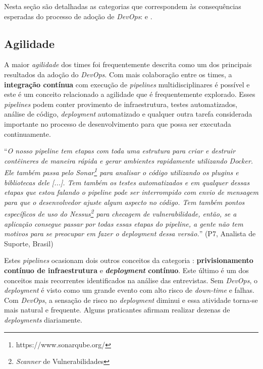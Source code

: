 Nesta seção são detalhadas as categorias que correspondem às consequências
esperadas do processo de adoção de {\it DevOps}:  e .

\subsection{Agilidade}\label{subsecao_agilidade}

A maior {\it agilidade} dos times foi frequentemente descrita como um dos
principais resultados da adoção do {\it DevOps}. Com mais colaboração entre os
times, a {\bf integração contínua} com execução de {\it pipelines}
multidisciplinares é possível e este é um conceito relacionado a agilidade que
é frequentemente explorado. Esses {\it pipelines} podem conter provimento
de infraestrutura, testes automatizados, análise de código, {\it deployment}
automatizado e qualquer outra tarefa considerada importante no processo de
desenvolvimento para que possa ser executada continuamente.

\begin{mq}
``\emph{O nosso pipeline tem etapas com toda uma estrutura para criar e destruir
contêineres de maneira rápida e gerar ambientes rapidamente utilizando Docker.
Ele também passa pelo Sonar\footnote{https://www.sonarqube.org/} para
analisar o código utilizando os plugins e bibliotecas dele [...]. Tem também os
testes automatizados e em qualquer dessas etapas que estou falando o pipeline
pode ser interrompido com envio de mensagem para que o desenvolvedor ajuste
algum aspecto no código. Tem também pontos específicos de uso do Nessus\footnote{{\it Scanner} de Vulnerabilidades}
para checagem de vulnerabilidade, então, se a aplicação consegue passar por
todas essas etapas do pipeline, a gente não tem motivos para se preocupar em
fazer o deployment dessa versão.}'' (P7, Analista de Suporte, Brasil)
\end{mq}

Estes {\it pipelines} ocasionam dois outros conceitos da categoria :
{\bf privisionamento contínuo de infraestrutura} e {\bf \emph{deployment} contínuo}.
Este último é um dos conceitos mais recorrentes identificados na análise das
entrevistas. Sem {\it DevOps}, o {\it deployment} é visto como um grande evento
com alto risco de {\it down-time} e falhas. Com {\it DevOps}, a sensação de
risco no {\it deployment} diminui e essa atividade torna-se mais natural e
frequente. Alguns praticantes afirmam realizar dezenas de {\it deployments}
diariamente.

